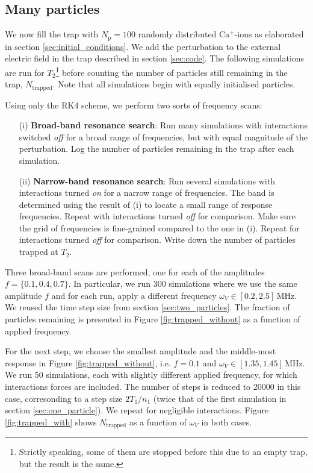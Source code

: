 \subsection{Many particles}\label{sec:many_particles}

We now fill the trap with $N_\mathrm{p} = 100$ randomly distributed Ca$^+$-ions as elaborated in section \ref{sec:initial_conditions}. We add the perturbation to the external electric field in the trap described in section \ref{sec:code}. The following simulations are run for $T_2$\footnote{Strictly speaking, some of them are stopped before this due to an empty trap, but the result is the same.} before counting the number of particles still remaining in the trap, $N_\mathrm{trapped}$. Note that all simulations begin with equally initialised particles.

Using only the RK4 scheme, we perform two sorts of frequency scans:


\begin{itemize} %
    \item[(i)] \textbf{Broad-band resonance search}: Run many simulations with interactions switched \textit{off} for a broad range of frequencies, but with equal magnitude of the perturbation. Log the number of particles remaining in the trap after each simulation.
    \item[(ii)] \textbf{Narrow-band resonance search}: Run several simulations with interactions turned \textit{on} for a narrow range of frequencies. The band is determined using the result of (i) to locate a small range of response frequencies. Repeat with interactions turned \textit{off} for comparison. Make sure the grid of frequencies is fine-grained compared to the one in (i).  Repeat for interactions turned \textit{off} for comparison. Write down the number of particles trapped at $T_2$.
\end{itemize}

Three broad-band scans are performed, one for each of the amplitudes $f=\{0.1, 0.4, 0.7\}$. In particular, we run 300 simulations where we use the same amplitude $f$ and for each run, apply a different frequency $\omega_V \in[0.2,2.5] \,\mathrm{MHz}$. We reused the time step size from section \ref{sec:two_particles}. The fraction of particles remaining is presented in Figure \ref{fig:trapped_without} as a function of applied frequency. 

For the next step, we choose the smallest amplitude and the middle-most  response in Figure \ref{fig:trapped_without}, i.e. $f=0.1$ and $\omega_V \in[1.35,1.45] \,\mathrm{MHz}$. We run 50 simulations, each with slightly different applied frequency, for which interactions forces are included. The number of steps is reduced to 20000 in this case, corresonding to a step size $2 T_1/n_1$ (twice that of the first simulation in section \ref{sec:one_particle}). We repeat for negligible interactions. Figure \ref{fig:trapped_with} shows $N_\mathrm{trapped}$ as a function of $\omega_V$ in both cases.



